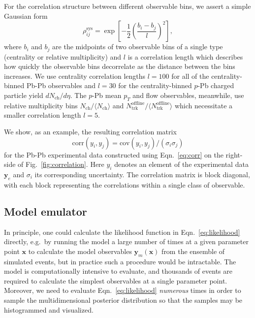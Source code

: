 \documentclass[aps,prc,reprint,amsmath,nofootinbib]{revtex4-1}
\newcommand{\nch}{N_\text{ch}}
\newcommand{\ntrk}{N_\text{trk}^\text{offline}}
\newcommand{\x}{\mathbf{x}}
\newcommand{\y}{\mathbf{y}}
\begin{document}
For the correlation structure between different observable bins, we assert a simple Gaussian form
\begin{equation}
  \label{eq:corr}
  \rho_{ij}^\text{sys} = \exp \left[ -\frac{1}{2} \left(\frac{b_i - b_j}{l} \right)^2 \right],
\end{equation}
where $b_i$ and $b_j$ are the midpoints of two observable bins of a single type (centrality or relative multiplicity) and $l$ is a correlation length which describes how quickly the observable bins decorrelate as the distance between the bins increases.
We use centrality correlation lengths $l=100$ for all of the centrality-binned Pb-Pb observables and $l=30$ for the centrality-binned $p$-Pb charged particle yield $d\nch/d\eta$.
The \mbox{$p$-Pb} mean $p_T$ and flow observables, meanwhile, use relative multiplicity bins $\nch / \langle \nch \rangle$ and $\ntrk / \langle \ntrk \rangle$ which necessitate a smaller correlation length $l=5$.

We show, as an example, the resulting correlation matrix
\begin{equation}
  \mathrm{corr}(y_i, y_j) = \mathrm{cov}(y_i, y_j)/(\sigma_i \sigma_j)
\end{equation}
for the Pb-Pb experimental data constructed using Eqn.~\eqref{eq:corr} on the right-side of Fig.~\ref{fig:correlation}.
Here $y_i$ denotes an element of the experimental data $\y_e$ and $\sigma_i$ its corresponding uncertainty.
The correlation matrix is block diagonal, with each block representing the correlations within a single class of observable.

\subsection{Model emulator}

In principle, one could calculate the likelihood function in Eqn.~\eqref{eq:likelihood} directly, e.g.\ by running the model a large number of times at a given parameter point $\x$ to calculate the model observables $\y_m(\x)$ from the ensemble of simulated events, but in practice such a procedure would be intractable.
The model is computationally intensive to evaluate, and thousands of events are required to calculate the simplest observables at a single parameter point.
Moreover, we need to evaluate Eqn.~\eqref{eq:likelihood} \emph{numerous} times in order to sample the multidimensional posterior distribution so that the samples may be histogrammed and visualized.
\end{document}
